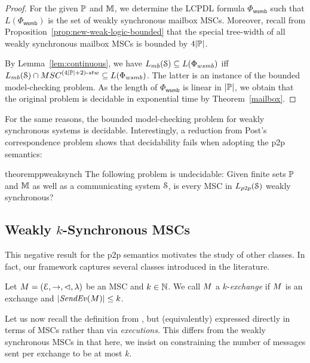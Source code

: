 \documentclass[a4paper,UKenglish,cleveref, autoref, thm-restate]{lipics-v2021}
\begin{document}
\begin{proof}
For the given $\mathbb{P}$ and $\mathbb{M}$, we determine the LCPDL formula $\Phi_\mathsf{wsmb}$ such
that $L(\Phi_\mathsf{wsmb})$ is the set of weakly synchronous mailbox MSCs. Moreover,
recall from Proposition~\ref{prop:new-weak-logic-bounded} that
the special tree-width of all weakly synchronous mailbox MSCs is bounded by
$4|\mathbb{P}|$.

By Lemma~\ref{lem:continuous}, we have
$\mbL{\System} \subseteq L(\Phi_\mathsf{wsmb})$ iff
$\mbL{\System} \cap \stwMSCs{(4|\Procs|+2)} \subseteq L(\Phi_\mathsf{wsmb})$.
The latter is an instance of the bounded model-checking problem.
As the length of $\Phi_\mathsf{wsmb}$ is linear in
$|\mathbb{P}|$, we obtain that the original problem is decidable
in exponential time by Theorem~\ref{mailbox}.
\end{proof}

For the same reasons, the bounded model-checking problem for weakly
synchronous systems is decidable.
%
Interestingly, a reduction from Post's correspondence problem
shows that decidability fails when adopting the p2p semantics:

\begin{restatable}{theorem}{ppweaksynch}\label{thm:p2p-weak-sync}
The following problem is undecidable:
Given finite sets $\mathbb{P}$ and $\mathbb{M}$ as well as a communicating system $\mathcal{S}$,
is every MSC in $\ppL{\System}$ weakly synchronous?
\end{restatable}


\subsection{Weakly $k$-Synchronous MSCs}\label{sec:weakly-k}

This negative result for the p2p semantics motivates the study of other classes.
In fact, our framework captures several classes introduced in the literature.

\begin{definition}[$k$-exchange]\label{def:weak-synchr}
Let $M = (\mathcal{E},\to,\lhd,\lambda)$ be an MSC
and $k \in \mathbb{N}$.
We call $M$ a $k$-\emph{exchange} if
$M$ is an exchange and $|\mathit{SendEv}(M)| \le k$.
\end{definition}


Let us now recall the definition
from \cite{DBLP:conf/cav/BouajjaniEJQ18,DBLP:conf/fossacs/GiustoLL20}, but (equivalently)
expressed directly in terms of MSCs rather than via \emph{executions}. This differs from the weakly synchronous MSCs in that here, we insist on constraining the number of messages sent per exchange to be at most $k$.
\end{document}
